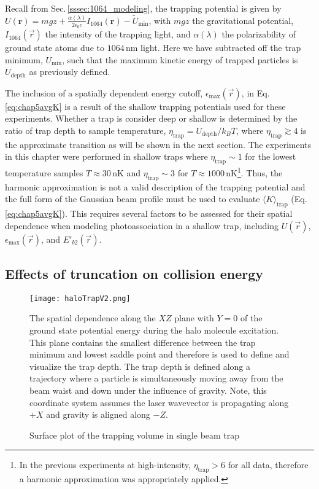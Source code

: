 Recall from Sec.\,\ref{sssec:1064_modeling}, the trapping potential is given by $U(\mathbf{r})=mgz + \frac{\alpha(\lambda)}{2 \epsilon_0 c} I_{1064}(\mathbf{r})-\tilde{U}_{\text{min}}$, with $mgz$ the gravitational potential, $I_{1064}(\vec{r})$ the intensity of the trapping light, and $\alpha(\lambda)$ the polarizability of ground state atoms due to $1064$\,nm light.
Here we have subtracted off the trap minimum, $U_{\text{min}}$, such that the maximum kinetic energy of trapped particles is $U_{\text{depth}}$ as previously defined.

The inclusion of a spatially dependent energy cutoff, $\epsilon_{\text{max}}(\vec{r})$, in Eq.\,\ref{eq:chap5avgK} is a result of the shallow trapping potentials used for these experiments.
Whether a trap is consider deep or shallow is determined by the ratio of trap depth to sample temperature, $\eta_{\text{trap}} = U_\text{depth}/k_B T$, where $\eta_{\text{trap}} \gtrsim 4$ is the approximate transition as will be shown in the next section.
The experiments in this chapter were performed in shallow traps where $\eta_\text{trap} \sim 1$ for the lowest temperature samples $T \approx 30$\,nK and $\eta_\text{trap} \sim 3$ for $T \approx 1000$\,nK\footnote{In the previous experiments at high-intensity, $\eta_\text{trap} > 6$ for all data, therefore a harmonic approximation was appropriately applied.}.
Thus, the harmonic approximation is not a valid description of the trapping potential and the full form of the Gaussian beam profile must be used to evaluate $\langle K \rangle_\text{trap}$ (Eq.\,\ref{eq:chap5avgK}).
This requires several factors to be assessed for their spatial dependence when modeling photoassociation in a shallow trap, including $U(\vec{r})$, $\epsilon_\text{max}(\vec{r})$, and $E'_{b2}(\vec{r})$.

\subsection{Effects of truncation on collision energy} \label{sec:trunc_trap}
	\begin{figure} 
	\centerline{
	  \texttt{[image: haloTrapV2.png]}}
	  \caption{Surface plot of the trapping volume in single beam trap}{The spatial dependence along the $XZ$ plane with $Y=0$ of the ground state potential energy during the halo molecule excitation. This plane contains the smallest difference between the trap minimum and lowest saddle point and therefore is used to define and visualize the trap depth. 
	  The trap depth is defined along a trajectory where a particle is simultaneously moving away from the beam waist and down under the influence of gravity. Note, this coordinate system assumes the laser wavevector is propagating along $+X$ and gravity is aligned along $-Z$. }
	  \label{fig:haloTrapModel}
	\end{figure}
	
